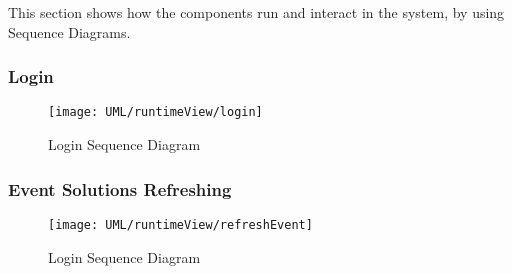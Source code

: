 This section shows how the components run and interact in the system, by using Sequence Diagrams.

\subsubsection{Login}

	\begin{figure}[H]
		\centering
		\texttt{[image: UML/runtimeView/login]}
		\caption{Login Sequence Diagram}
		\label{loginRunTimeView}
	\end{figure}
	
\subsubsection{Event Solutions Refreshing}

	\begin{figure}[H]
		\centering
		\texttt{[image: UML/runtimeView/refreshEvent]}
		\caption{Login Sequence Diagram}
		\label{refreshRunTimeView}
	\end{figure}